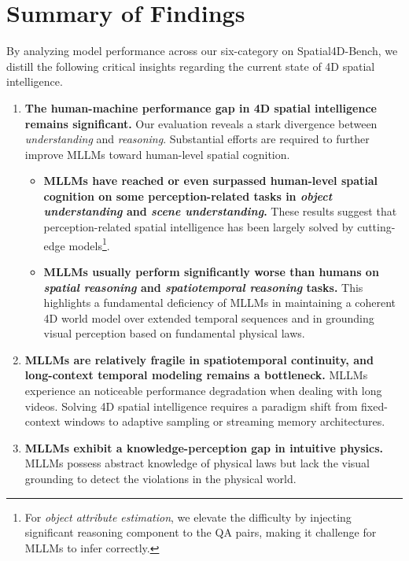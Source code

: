 \section{Summary of Findings}
\label{our_findings}

By analyzing model performance across our six-category on Spatial4D-Bench, we distill the following critical insights regarding the current state of 4D spatial intelligence.


\begin{enumerate}
  \item{
    \textbf{
    The human-machine performance gap in 4D spatial intelligence remains significant.} Our evaluation reveals a stark divergence between \textit{understanding} and \textit{reasoning}.
    Substantial efforts are required to further improve MLLMs toward human-level spatial cognition.
    \begin{itemize}
      \item{
    \textbf{MLLMs have reached or even surpassed human-level spatial cognition on some perception-related tasks in \textit{object understanding} and \textit{scene understanding}.} 
    These results suggest that perception-related spatial intelligence has been largely solved by cutting-edge models\footnote{For \textit{object attribute estimation}, we elevate the difficulty by injecting significant reasoning component to the QA pairs, making it challenge for MLLMs to infer correctly.}.
  }
  \item{
    \textbf{MLLMs usually perform significantly worse than humans on \textit{spatial reasoning} and \textit{spatiotemporal reasoning} tasks.}
    This highlights a fundamental deficiency of MLLMs in maintaining a coherent 4D world model over extended temporal sequences and in grounding visual perception based on fundamental physical laws.
    }  
    \end{itemize}
  }
    \item{
    \textbf{MLLMs are relatively fragile in spatiotemporal continuity, and long-context temporal modeling remains a bottleneck.}
    MLLMs experience an noticeable performance degradation when dealing with long videos.
    Solving 4D spatial intelligence requires a paradigm shift from fixed-context windows to adaptive sampling or streaming memory architectures.
    }
    \item{
    \textbf{MLLMs exhibit a knowledge-perception gap in intuitive physics.} MLLMs possess abstract knowledge of physical laws but lack the visual grounding to detect the violations in the physical world.
    }


\end{enumerate}
